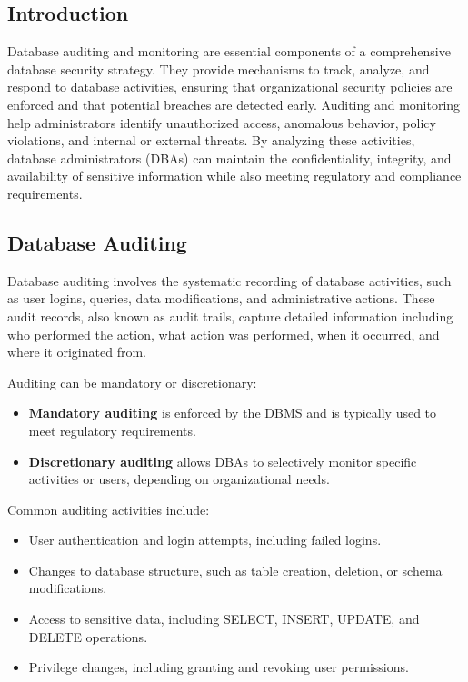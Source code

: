 \documentclass[12pt,a4paper]{article}
\begin{document}
\subsection*{Introduction}

Database auditing and monitoring are essential components of a comprehensive database security strategy. They provide mechanisms to track, analyze, and respond to database activities, ensuring that organizational security policies are enforced and that potential breaches are detected early. Auditing and monitoring help administrators identify unauthorized access, anomalous behavior, policy violations, and internal or external threats. By analyzing these activities, database administrators (DBAs) can maintain the confidentiality, integrity, and availability of sensitive information while also meeting regulatory and compliance requirements.

\subsection{Database Auditing}

Database auditing involves the systematic recording of database activities, such as user logins, queries, data modifications, and administrative actions. These audit records, also known as audit trails, capture detailed information including who performed the action, what action was performed, when it occurred, and where it originated from.

Auditing can be mandatory or discretionary:
\begin{itemize}
  \item \textbf{Mandatory auditing} is enforced by the DBMS and is typically used to meet regulatory requirements.
  \item \textbf{Discretionary auditing} allows DBAs to selectively monitor specific activities or users, depending on organizational needs.
\end{itemize}

Common auditing activities include:

\begin{itemize}
  \item User authentication and login attempts, including failed logins.
  \item Changes to database structure, such as table creation, deletion, or schema modifications.
  \item Access to sensitive data, including SELECT, INSERT, UPDATE, and DELETE operations.
  \item Privilege changes, including granting and revoking user permissions.
\end{itemize}
\end{document}

